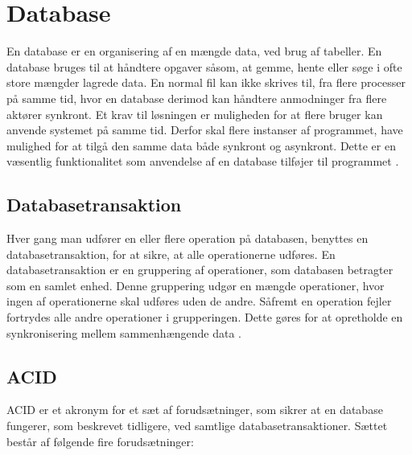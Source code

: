 \section{Database} 
\label{sec:database}

En database er en organisering af en mængde data, ved brug af tabeller. En database bruges til at håndtere opgaver såsom, at gemme, hente eller søge i ofte store mængder lagrede data. En normal fil kan ikke skrives til, fra flere processer på samme tid, hvor en database derimod kan håndtere anmodninger fra flere aktører synkront. Et krav til løsningen er muligheden for at flere bruger kan anvende systemet på samme tid. Derfor skal flere instanser af programmet, have mulighed for at tilgå den samme data både synkront og asynkront. Dette er en væsentlig funktionalitet som anvendelse af en database tilføjer til programmet \cite{umb_database}. 

\subsection{Databasetransaktion}
\label{sub:databasetransaktion}

Hver gang man udfører en eller flere operation på databasen, benyttes en databasetransaktion, for at sikre, at alle operationerne udføres. En databasetransaktion er en gruppering af operationer, som databasen betragter som en samlet enhed. Denne gruppering udgør en mængde operationer, hvor ingen af operationerne skal udføres uden de andre. Såfremt en operation fejler fortrydes alle andre operationer i grupperingen. Dette gøres for at opretholde en synkronisering mellem sammenhængende data \cite{databasetransaktion}.

\subsection{ACID}
\label{sub:acid}

ACID er et akronym for et sæt af forudsætninger, som sikrer at en database fungerer, som beskrevet tidligere, ved samtlige databasetransaktioner. Sættet består af følgende fire forudsætninger: 

